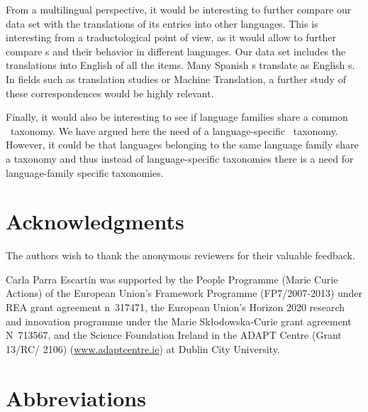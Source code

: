 \documentclass[output=paper]{langsci/langscibook}
\begin{document}
From a multilingual perspective, it would be interesting to further compare our data set with the translations of its entries into other languages.
This is interesting from a traductological point of view, as it would allow to further compare \mwe s and their behavior in different languages.
Our data set includes the translations into English of all the items.
Many Spanish \mwe s translate as English \mwe s.
In fields such as translation studies or Machine Translation, a further study of these correspondences would be highly relevant.

Finally, it would also be interesting to see if language families share a common \mwe\ taxonomy.
We have argued here the need of a language-specific \mwe\ taxonomy.
However, it could be that languages belonging to the same language family share a taxonomy and thus instead of language-specific taxonomies there is a need for language-family specific taxonomies.

\largerpage
\section*{Acknowledgments}
The authors wish to thank the anonymous reviewers for their valuable feedback.
                   
Carla Parra Escartín was supported by the People Programme (Marie Curie Actions) of the European Union's Framework Programme (FP7/2007-2013) under REA grant agreement n\textordmasculine~317471, the European Union’s Horizon 2020 research and innovation programme under the Marie Skłodowska-Curie grant agreement N\textordmasculine~713567, and the Science Foundation Ireland in the ADAPT Centre (Grant 13/RC/ 2106) (\url{www.adaptcentre.ie}) at Dublin City University.
\nocite{CREA,CORPES}



\section*{Abbreviations}

 
\end{document}
